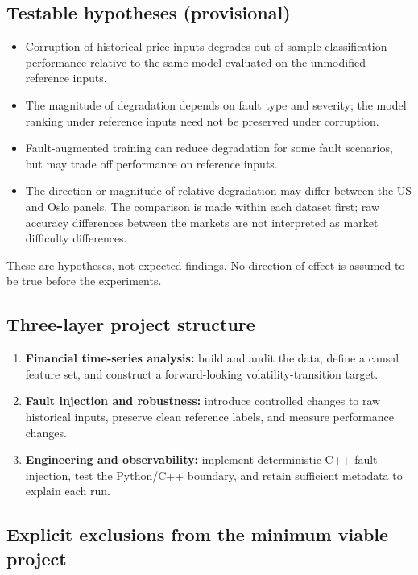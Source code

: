 \documentclass[11pt,a4paper]{article}
\begin{document}
\subsection{Testable hypotheses (provisional)}

\begin{itemize}
  \item[H1.] Corruption of historical price inputs degrades out-of-sample classification performance relative to the same model evaluated on the unmodified reference inputs.
  \item[H2.] The magnitude of degradation depends on fault type and severity; the model ranking under reference inputs need not be preserved under corruption.
  \item[H3.] Fault-augmented training can reduce degradation for some fault scenarios, but may trade off performance on reference inputs.
  \item[H4.] The direction or magnitude of relative degradation may differ between the US and Oslo panels. The comparison is made within each dataset first; raw accuracy differences between the markets are not interpreted as market difficulty differences.
\end{itemize}

These are hypotheses, not expected findings. No direction of effect is assumed to be true before the experiments.

\subsection{Three-layer project structure}

\begin{enumerate}
  \item \textbf{Financial time-series analysis:} build and audit the data, define a causal feature set, and construct a forward-looking volatility-transition target.
  \item \textbf{Fault injection and robustness:} introduce controlled changes to raw historical inputs, preserve clean reference labels, and measure performance changes.
  \item \textbf{Engineering and observability:} implement deterministic C++ fault injection, test the Python/C++ boundary, and retain sufficient metadata to explain each run.
\end{enumerate}

\subsection{Explicit exclusions from the minimum viable project}
\end{document}
